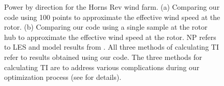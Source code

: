 \documentclass[conf]{new-aiaa}
\begin{document}
\begin{figure}[htbp!]
	\centering
	\caption{Power by direction for the Horns Rev wind farm. (a) Comparing our code using 100 points to approximate the effective wind speed at the rotor. (b) Comparing our code using a single sample at the rotor hub to approximate the effective wind speed at the rotor. NP refers to LES and model results from \cite{niayifar2016}. All three methods of calculating TI refer to results obtained using our code. The three methods for calculating TI are to address various complications during our optimization process (see  for details).}
	
	\label{fig:power_direction}
\end{figure}
\end{document}
